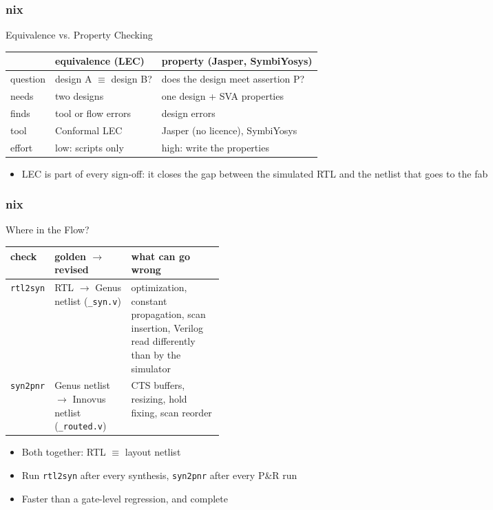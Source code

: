 \documentclass{beamer}
\newcommand{\astitle}{nix}
\newcommand{\assubtitle}{nix}
\newcommand{\cmd}[1]{\texttt{#1}}
\begin{document}
\renewcommand{\assubtitle}{Equivalence vs. Property Checking}
\begin{frame}
\frametitle{\astitle}
\begin{block}{\assubtitle}
  \footnotesize
  \begin{tabularx}{\linewidth}{@{}lYY@{}}
    & \textbf{equivalence (LEC)} & \textbf{property (Jasper, SymbiYosys)}\\\hline
    question & design A $\equiv$ design B? & does the design meet assertion P?\\
    needs    & two designs              & one design + SVA properties\\
    finds    & tool or flow errors      & design errors\\
    tool     & Conformal LEC            & Jasper (no licence), SymbiYosys\\
    effort   & low: scripts only        & high: write the properties\\
  \end{tabularx}
  \vspace{4pt}
  \begin{itemize}
    \item LEC is part of every sign-off: it closes the gap between the
      simulated RTL and the netlist that goes to the fab
  \end{itemize}
\end{block}
\end{frame}

\renewcommand{\assubtitle}{Where in the Flow?}
\begin{frame}
\frametitle{\astitle}
\begin{block}{\assubtitle}
  \footnotesize
  \begin{tabularx}{\linewidth}{@{}lp{0.36\linewidth}Y@{}}
    \textbf{check} & \textbf{golden $\rightarrow$ revised} & \textbf{what can go wrong}\\\hline
    \cmd{rtl2syn} & RTL $\rightarrow$ Genus netlist (\cmd{\_syn.v})
                  & optimization, constant propagation, scan insertion,
                    Verilog read differently than by the simulator\\
    \cmd{syn2pnr} & Genus netlist $\rightarrow$ Innovus netlist
                    (\cmd{\_routed.v})
                  & CTS buffers, resizing, hold fixing, scan reorder\\
  \end{tabularx}
  \vspace{4pt}
  \begin{itemize}
    \item Both together: RTL $\equiv$ layout netlist
    \item Run \cmd{rtl2syn} after every synthesis, \cmd{syn2pnr} after
      every P\&R run
    \item Faster than a gate-level regression, and complete
  \end{itemize}
\end{block}
\end{frame}
\end{document}
